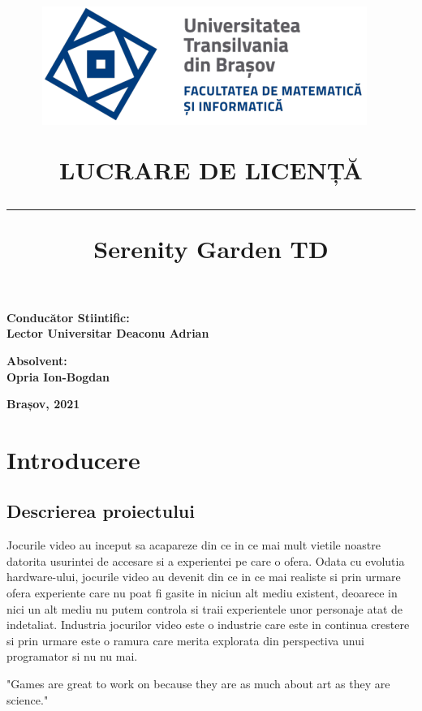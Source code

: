 \documentclass[12pt, a4paper]{article}
\title{%
	\includegraphics[height=0.3\textwidth]{UNITBV2.png}~ 
	\\[1cm]
	\vspace{20mm}
	
	\bf 	LUCRARE DE LICENȚĂ
	\noindent\rule{14cm}{1pt}
	\bf Serenity Garden TD
}
\date{}
\begin{document}
	
	
	
	\maketitle
	\vspace{10mm} %
	\begin{flushleft}
		\bf 	Conducător Stiintific:
		\bf     \\Lector Universitar Deaconu Adrian
	\end{flushleft}
	
	\begin{flushright}
		\bf Absolvent:
		\bf \\Opria Ion-Bogdan
	\end{flushright}
	
	\vspace{6mm} %
	
	\begin{center}
		\bf Brașov, 2021 
	\end{center}
	
	
	\tableofcontents
	\pagebreak
	
	\section{Introducere}
	
	
	
	
	
	\subsection{Descrierea proiectului}
	
	Jocurile video au inceput sa acapareze din ce in ce mai mult vietile noastre datorita usurintei de accesare si a experientei pe care o ofera. Odata cu evolutia hardware-ului, jocurile video au devenit din ce in ce mai realiste si prin urmare ofera experiente care nu poat fi gasite in niciun alt mediu existent, deoarece in nici un alt mediu nu putem controla si traii experientele unor personaje atat de indetaliat. Industria jocurilor video este o industrie care este in continua crestere si prin urmare este o ramura care merita explorata din perspectiva unui programator si nu nu mai. 
	\newline
	
	"Games are great to work on because they are as much about art as they are science." \cite{gameProgrammingComplete}
	\newline
	
\end{document}
